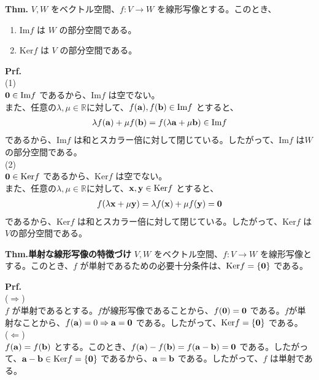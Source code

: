 \documentclass[a4paper,11pt]{jsarticle}
\numberwithin{equation}{section}
\begin{document}
\begin{itembox}[l]{\textbf{Thm.}}
  $V, W$ をベクトル空間、$f: V \rightarrow W$ を線形写像とする。このとき、
  \begin{enumerate}
    \item $\text{Im}f$ は $W$ の部分空間である。
    \item $\text{Ker}f$ は $V$ の部分空間である。
  \end{enumerate}
\end{itembox}
\textbf{Prf.}\\
(1)\\
$\vb{0} \in \text{Im}f$ であるから、$\text{Im}f$ は空でない。\\
また、任意の$\lambda, \mu \in \mathbb{R}$に対して、$f(\vb{a}), f(\vb{b}) \in \text{Im}f$ とすると、
\begin{align}
  \lambda f(\vb{a}) + \mu f(\vb{b}) = f(\lambda \vb{a} + \mu \vb{b}) \in \text{Im}f
\end{align}
であるから、$\text{Im}f$ は和とスカラー倍に対して閉じている。したがって、$\text{Im}f$ は$W$の部分空間である。\\
(2)\\
$\vb{0} \in \text{Ker}f$ であるから、$\text{Ker}f$ は空でない。\\
また、任意の$\lambda, \mu \in \mathbb{R}$に対して、$\vb{x}, \vb{y} \in \text{Ker}f$ とすると、
\begin{align}
  f(\lambda \vb{x} + \mu \vb{y}) = \lambda f(\vb{x}) + \mu f(\vb{y}) = \vb{0}
\end{align}
であるから、$\text{Ker}f$ は和とスカラー倍に対して閉じている。したがって、$\text{Ker}f$ は$V$の部分空間である。\hfill\qedsymbol\\

\begin{itembox}[l]{\textbf{Thm.単射な線形写像の特徴づけ}}
  $V, W$ をベクトル空間、$f: V \rightarrow W$ を線形写像とする。このとき、$f$ が単射であるための必要十分条件は、$\text{Ker}f = \left\{ \vb{0} \right\}$ である。
\end{itembox}
\textbf{Prf.}\\
($\Rightarrow$)\\
$f$ が単射であるとする。$f$が線形写像であることから、$f(\vb{0}) = \vb{0}$ である。$f$が単射なことから、$f(\vb{a})=0 \Rightarrow \vb{a} = \vb{0}$ である。したがって、$\text{Ker}f = \left\{ \vb{0} \right\}$ である。\\
($\Leftarrow$)\\
$f(\vb{a}) = f(\vb{b})$ とする。このとき、$f(\vb{a}) - f(\vb{b}) = f(\vb{a} - \vb{b}) = \vb{0}$ である。したがって、$\vb{a} - \vb{b} \in \text{Ker}f = \left\{ \vb{0} \right\}$ であるから、$\vb{a} = \vb{b}$ である。したがって、$f$ は単射である。\hfill\qedsymbol\\
\end{document}
